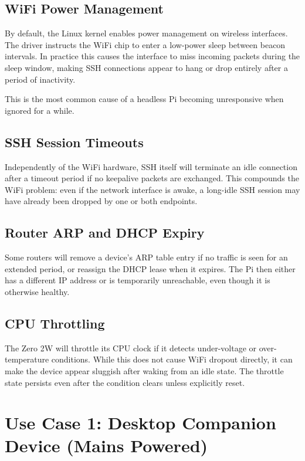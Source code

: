\documentclass[11pt,letter]{article}
\begin{document}
\subsection{WiFi Power Management}

By default, the Linux kernel enables power management on wireless interfaces. The driver instructs the WiFi chip to enter a low-power sleep between beacon intervals. In practice this causes the interface to miss incoming packets during the sleep window, making SSH connections appear to hang or drop entirely after a period of inactivity.

This is the most common cause of a headless Pi becoming unresponsive when ignored for a while.

\subsection{SSH Session Timeouts}

Independently of the WiFi hardware, SSH itself will terminate an idle connection after a timeout period if no keepalive packets are exchanged. This compounds the WiFi problem: even if the network interface is awake, a long-idle SSH session may have already been dropped by one or both endpoints.

\subsection{Router ARP and DHCP Expiry}

Some routers will remove a device's ARP table entry if no traffic is seen for an extended period, or reassign the DHCP lease when it expires. The Pi then either has a different IP address or is temporarily unreachable, even though it is otherwise healthy.

\subsection{CPU Throttling}

The Zero 2W will throttle its CPU clock if it detects under-voltage or over-temperature conditions. While this does not cause WiFi dropout directly, it can make the device appear sluggish after waking from an idle state. The throttle state persists even after the condition clears unless explicitly reset.

\section{Use Case 1: Desktop Companion Device (Mains Powered)}
\end{document}

